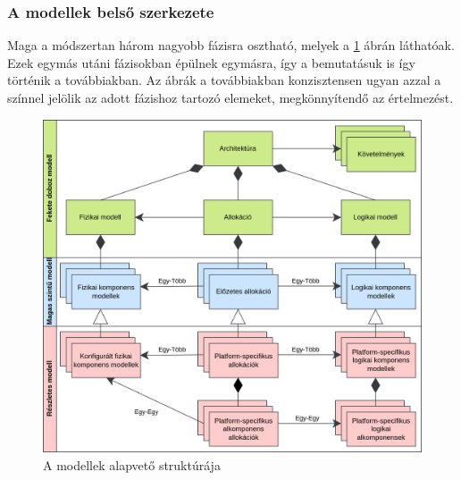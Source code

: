         \subsubsection{A modellek belső szerkezete} \label{sec:ModellekSzerkezete}
        Maga a módszertan három nagyobb fázisra osztható, melyek a \ref{fig:ModellStruktúra} ábrán láthatóak. Ezek egymás utáni fázisokban épülnek egymásra, így a bemutatásuk is így történik a továbbiakban.
        Az ábrák a továbbiakban konzisztensen ugyan azzal a színnel jelölik az adott fázishoz tartozó elemeket, megkönnyítendő az értelmezést.
        \begin{figure}[!ht]
            \centering
            \includegraphics[width=150mm, keepaspectratio]{figures/AllocationBased2HU.drawio.png}
            \caption{A modellek alapvető struktúrája} 
            \label{fig:ModellStruktúra}
        \end{figure}

